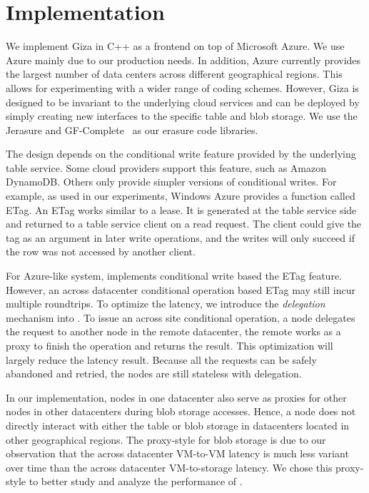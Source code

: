 \section{Implementation}
We implement Giza in C++ as a frontend on top of Microsoft Azure. We use Azure mainly 
due to our production needs. In addition, Azure currently provides the largest number 
of data centers across different geographical regions. This allows for experimenting 
with a wider range of coding schemes. However, Giza is designed to be invariant to the 
underlying cloud services and can be deployed by simply creating new interfaces to the 
specific table and blob storage. 
We use the Jerasure and GF-Complete~\cite{Jerasure} as our erasure code libraries.

The \name design depends on the conditional write feature provided by the underlying 
table service. Some cloud providers support this feature, such as Amazon DynamoDB.
Others only provide simpler versions of conditional writes. For example, as used in our
experiments, Windows Azure provides a function called ETag. An ETag works similar to
a lease. It is generated at the table service side and returned to a table service client
on a read request. The client could give the tag as an argument in later write operations,
and the writes will only succeed if the row was not accessed by another client.

For Azure-like system, {\name} implements conditional write based the ETag feature.
However, an across datacenter conditional operation based ETag may still incur multiple
roundtrips. To optimize the latency, we introduce the \emph{delegation} mechanism
into {\name}. To issue an across site conditional operation, a {\name} node delegates the
request to another {\name} node in the remote datacenter, the remote {\name} works as
a proxy to finish the operation and returns the result. This optimization will largely
reduce the latency result. Because all the requests can be safely abandoned and retried,
the {\name} nodes are still stateless with delegation.

In our implementation, \name nodes in one datacenter also serve as proxies for other 
nodes in other datacenters during blob storage accesses. 
Hence, a \name node does not directly interact with either the table or blob storage 
in datacenters located in other geographical regions. The proxy-style for blob storage 
is due to our observation that the across datacenter VM-to-VM latency is much less variant 
over time than the across datacenter VM-to-storage latency. We chose this proxy-style 
to better study and analyze the performance of \name.

